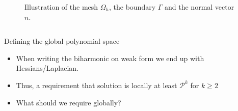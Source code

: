 \begin{frame}
\begin{columns}
\begin{figure}[htpb!]
    \caption{ Illustration of the mesh $\Omega_{h} $, the boundary $\Gamma $ and the normal vector $n$. }
    \label{fig:domain_construction}
\end{figure}
\end{columns}

\end{frame}


\begin{frame}
\begin{block}{Defining the global polynomial space}
    \begin{itemize}
        \item When writing the biharmonic on weak form we end up with Hessians/Laplacian.
        \item Thus, a requirement that solution is locally at least $\mathcal{P}^{k} $ for $k\ge 2$
        \item What should we require globally?
    \end{itemize}
\end{block}
\end{frame}

